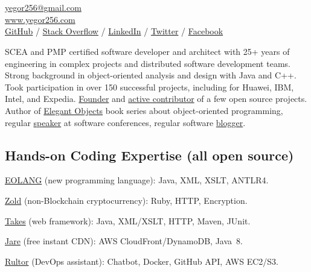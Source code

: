 \documentclass{yb}
\begin{document}
\ybPrintPhoto{}

\section*{\Large {}}

\href{mailto:yegor256@gmail.com}{yegor256@gmail.com}\\%
\href{https://www.yegor256.com}{www.yegor256.com}\\%
\href{https://github.com/yegor256}{GitHub} /
\href{https://stackexchange.com/users/63162/yegor256}{Stack Overflow} /
\href{https://www.linkedin.com/in/yegor256}{LinkedIn} /
\href{https://twitter.com/intent/follow?screen_name=yegor256}{Twitter} /
\href{https://www.facebook.com/yegor256}{Facebook}

\vspace*{12pt}

SCEA and PMP certified software developer and architect with
25+ years of engineering in complex projects and distributed software
development teams. Strong background in object-oriented analysis and design
with Java and C++. Took participation in over 150 successful projects,
including for Huawei, IBM, Intel, and Expedia. \href{https://www.yegor256.com/pets.html}{Founder}
and \href{https://github.com/yegor256}{active contributor} of
a few open source projects. Author of
\href{https://www.yegor256.com/elegant-objects.html}{Elegant Objects}
book series about object-oriented programming,
regular \href{https://www.yegor256.com/talks.html}{speaker} at software conferences, regular software
\href{https://www.yegor256.com}{blogger}.

\subsection*{Hands-on Coding Expertise (all open source)}

\href{https://www.eolang.org}{EOLANG} (new programming language):
Java, XML, XSLT, ANTLR4.

\href{https://www.zold.io}{Zold} (non-Blockchain cryptocurrency):
Ruby, HTTP, Encryption.

\href{https://www.takes.org}{Takes} (web framework):
Java, XML/XSLT, HTTP, Maven, JUnit.

\href{https://www.jare.io}{Jare} (free instant CDN):
AWS CloudFront/DynamoDB, Java~8.

\href{https://www.rultor.com}{Rultor} (DevOps assistant):
Chatbot, Docker, GitHub API, AWS EC2/S3.
\end{document}
